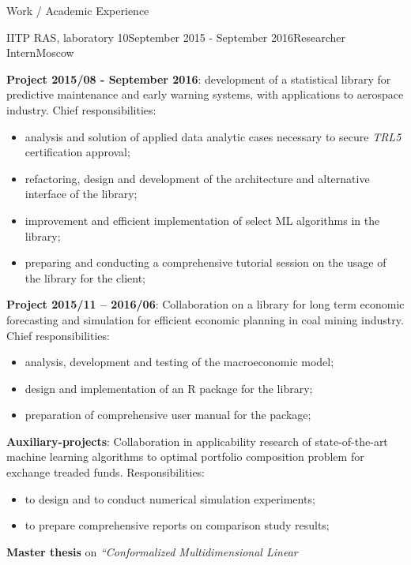 \documentclass{resume} %
\begin{document}
\begin{rSection}{Work / Academic Experience}
\begin{rSubsection}{IITP RAS, laboratory 10}{September 2015 - September 2016}{Researcher Intern}{Moscow}
    \item \textbf{Project 2015/08 - September 2016}: development of a statistical library
    for predictive maintenance and early warning systems, with applications to
    aerospace industry. Chief responsibilities: \begin{itemize}
        \item analysis and solution of applied data analytic cases necessary to
        secure \textit{TRL5} certification approval;
        \item refactoring, design and development of the architecture and alternative
        interface of the library;
        \item improvement and efficient implementation of select ML algorithms in
        the library;
        \item preparing and conducting a comprehensive tutorial session on the usage
        of the library for the client;
    \end{itemize} \medskip
    \item \textbf{Project 2015/11 -- 2016/06}: Collaboration on a library for long
    term economic forecasting and simulation for efficient economic planning in coal
    mining industry. Chief responsibilities: \begin{itemize}
        \item analysis, development and testing of the macroeconomic model;
        \item design and implementation of an R package for the library;
        \item preparation of comprehensive user manual for the package;
    \end{itemize} \medskip
    \item \textbf{Auxiliary-projects}: Collaboration in applicability research of
    state-of-the-art machine learning algorithms to optimal portfolio composition
    problem for exchange treaded funds. Responsibilities: \begin{itemize}
        \item to design and to conduct numerical simulation experiments;
        \item to prepare comprehensive reports on comparison study results;
    \end{itemize} \medskip
    \item \textbf{Master thesis} on \textit{``Conformalized Multidimensional Linear
}
\end{rSubsection}
\end{rSection}
\end{document}
